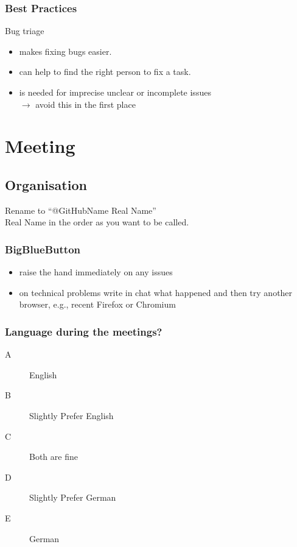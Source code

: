 \begin{frame}
	\frametitle{Best Practices}

	Bug triage
	\begin{itemize}
		\item makes fixing bugs easier.
		\item can help to find the right person to fix a task.
		\item is needed for imprecise unclear or incomplete issues \\
			$\rightarrow$ avoid this in the first place
	\end{itemize}
\end{frame}

\section{Meeting}

\subsection{Organisation}

\begin{frame}
	\begin{task}
	Rename to ``@GitHubName Real Name'' \\
	Real Name in the order as you want to be called.
	\end{task}

	\frametitle{BigBlueButton}
	\begin{itemize}
		\item raise the hand immediately on any issues
		\item on technical problems write in chat what happened and then try another browser, e.g., recent Firefox or Chromium
	\end{itemize}
\end{frame}

\begin{assignment}
	\frametitle{Language during the meetings?}
	\begin{task}
	\begin{description}
	\item[A] English
	\item[B] Slightly Prefer English
	\item[C] Both are fine
	\item[D] Slightly Prefer German
	\item[E] German
	\end{description}
	\end{task}
\end{assignment}

